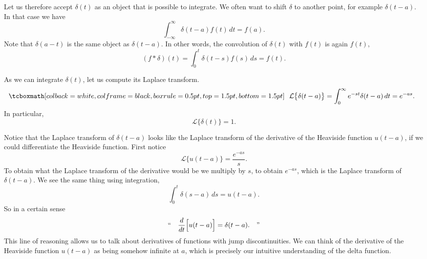 Let us therefore accept $\delta(t)$ as an object that is possible to
integrate.  We often want to shift $\delta$ to another point, for example
$\delta(t-a)$.  In that case we have
\begin{equation*}
\int_{-\infty}^\infty \delta(t-a) f(t) \,dt = f(a) .
\end{equation*}
Note that $\delta(a-t)$ is the same object as $\delta(t-a)$.
In other words, the convolution of $\delta(t)$ with $f(t)$ is again $f(t)$,
\begin{equation*}
(f * \delta) (t) = 
\int_{0}^t \delta(t-s) f(s) \,ds
= f(t) .
\end{equation*}

As we can integrate $\delta(t)$, let us compute its Laplace transform.
\begin{equation*}
\mybxbg{~~
{\mathcal{L}} \bigl\{ \delta(t-a) \bigr\}
=
\int_{0}^\infty e^{-st} \delta(t-a) \,dt = e^{-as} .
~~}
\end{equation*}
In particular,
\begin{equation*}
{\mathcal{L}} \bigl\{ \delta(t) \bigr\} = 1 .
\end{equation*}

\begin{remark}
Notice that the Laplace transform of $\delta(t-a)$ looks like
the Laplace transform of the derivative of the Heaviside function
$u(t-a)$, if we could differentiate the Heaviside function.
First notice
\begin{equation*}
{\mathcal{L}} \bigl\{ u(t-a) \bigr\} = \frac{e^{-as}}{s}.
\end{equation*}
To obtain what the Laplace transform of the derivative would be
we multiply by $s$, to obtain $e^{-as}$, which is the Laplace transform
of $\delta(t-a)$.
We see the same thing using integration,
\begin{equation*}
\int_0^t \delta(s-a)\,ds = u(t-a) .
\end{equation*}
So in a certain sense
\begin{equation*}
\text{``}
\quad \frac{d}{dt} \Bigl[ u(t-a) \Bigr] = \delta(t-a) . \quad
\text{''}
\end{equation*}
This line of reasoning allows us to talk about derivatives of functions with jump
discontinuities.
We can think of
the derivative of the Heaviside function $u(t-a)$ as being somehow infinite
at $a$, which is precisely our intuitive understanding of the delta
function.
\end{remark}


